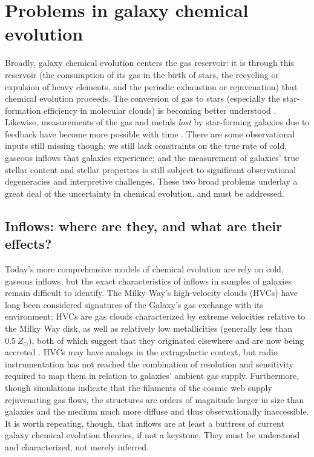 \section{Problems in galaxy chemical evolution}

Broadly, galaxy chemical evolution centers the gas reservoir: it is through this reservoir (the consumption of its gas in the birth of stars, the recycling or expulsion of heavy elements, and the periodic exhaustion or rejuvenation) that chemical evolution proceeds. The conversion of gas to stars (especially the star-formation efficiency in molecular clouds) is becoming better understood \citep[for recent reviews of star cluster formation and molecular clouds, see][]{krumholz_mckee_jbh_review,krumholz_14_sf-rev}. Likewise, measurements of the gas and metals \textit{lost} by star-forming galaxies due to feedback have become more possible with time \citep[, reviewed also in \citealt{finlator_17_chemev-review}, Section 2]{telford_19_m31-metal-loss, chisholm_18_outflows, belfiore_vincenzo_maiolino_19}. There are some observational inputs still missing though: we still lack constraints on the true rate of cold, gaseous inflows that galaxies experience; and the measurement of galaxies' true stellar content and stellar properties is still subject to significant observational degeneracies and interpretive challenges. These two broad problems underlay a great deal of the uncertainty in chemical evolution, and must be addressed.

\subsection{Inflows: where are they, and what are their effects?}

Today's more comprehensive models of chemical evolution are rely on cold, gaseous inflows, but the exact characteristics of inflows in samples of galaxies remain difficult to identify. The Milky Way's high-velocity clouds (HVCs) have long been considered signatures of the Galaxy's gas exchange with its environment: HVCs are gas clouds characterized by extreme velocities relative to the Milky Way disk, as well as relatively low metallicities (generally less than $0.5 ~ Z_{\odot}$), both of which suggest that they originated elsewhere and are now being accreted \citep{wakker_2004_hvc_bookchapter}. HVCs may have analogs in the extragalactic context, but radio instrumentation has not reached the combination of resolution and sensitivity required to map them in relation to galaxies' ambient gas supply. Furthermore, though simulations indicate that the filaments of the cosmic web supply rejuvenating gas flows, the structures are orders of magnitude larger in size than galaxies and the medium much more diffuse and thus observationally inaccessible. It is worth repeating, though, that inflows are at least a buttress of current galaxy chemical evolution theories, if not a keystone. They must be understood and characterized, not merely inferred.

